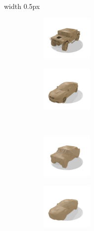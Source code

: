 \begin{figure}
\begin{subfigure}[t]{0.31\textwidth}
\begin{subfigure}[t]{0.475\textwidth}
        \end{subfigure}
    \end{subfigure} 
    {\color{black!25}\vrule width 0.5px}
    \begin{subfigure}[t]{0.31\textwidth}
        \vspace{0px}
        \centering
        \begin{subfigure}[t]{0.475\textwidth}
            \vspace{0px}
            \centering
            \includegraphics[width=2.5cm,trim={0.25cm 0.5cm 1.5cm 1.5cm},clip]{gfx/appendix_experiments_shapenet/meshes/00000}
        \end{subfigure}
        \begin{subfigure}[t]{0.475\textwidth}
            \vspace{0px}
            \centering
            \includegraphics[width=2.5cm,trim={0.25cm 0.5cm 1.5cm 1.5cm},clip]{gfx/appendix_experiments_shapenet/meshes/00002}
        \end{subfigure}\\
        \begin{subfigure}[t]{0.475\textwidth}
            \vspace{0px}
            \centering
            \includegraphics[width=2.5cm,trim={0.25cm 0.5cm 1.5cm 1.5cm},clip]{gfx/appendix_experiments_shapenet/meshes/00001}
        \end{subfigure}
        \begin{subfigure}[t]{0.475\textwidth}
            \vspace{0px}
            \centering
            \includegraphics[width=2.5cm,trim={0.25cm 0.5cm 1.5cm 1.5cm},clip]{gfx/appendix_experiments_shapenet/meshes/00003}

\end{subfigure}
\end{subfigure}
\end{figure}
